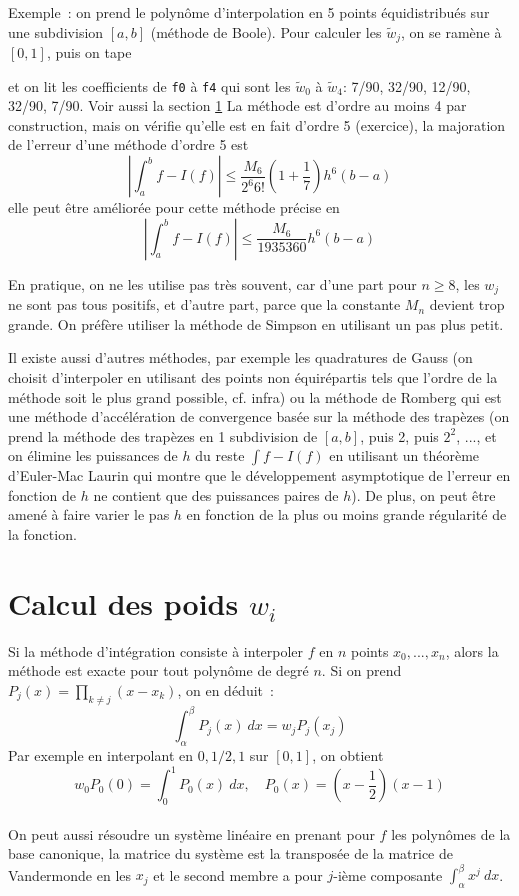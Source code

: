 \documentclass[a4paper,11pt]{book}
\begin{document}
\begin{giacjshere}
Exemple~: on prend le polyn\^ome d'interpolation en 5 points 
\'equidistribu\'es sur une subdivision $[a,b]$ (m\'ethode de Boole). 
Pour calculer les
$\tilde{w}_j$, on se ram\`ene \`a $[0,1]$, puis on tape
\begin{center}
\end{center}
et on lit les coefficients de \verb|f0| \`a \verb|f4|
qui sont les $\tilde{w}_0$ \`a  $\tilde{w}_4$: 7/90, 32/90, 12/90,
32/90, 7/90. Voir aussi la section \ref{sec:poids}
La m\'ethode est d'ordre au moins 4 par construction, mais on v\'erifie
qu'elle est en fait d'ordre 5 (exercice), la majoration de l'erreur
d'une m\'ethode d'ordre 5 est 
\[ |\int_a^b f -I(f)| \leq \frac{M_6}{2^6 6!}(1+\frac{1}{7}) h^6 (b-a) \]
elle peut \^etre am\'elior\'ee pour cette m\'ethode pr\'ecise en
\[ |\int_a^b f -I(f)| \leq \frac{M_6}{1935360} h^6 (b-a) \]

En pratique, on ne les utilise pas tr\`es souvent, car d'une part
pour $n\geq 8$, les $w_j$ ne sont pas tous positifs, et
d'autre part, parce que la constante $M_n$ devient trop
grande. On pr\'ef\`ere utiliser la m\'ethode de Simpson en utilisant
un pas plus petit.

Il existe aussi d'autres m\'ethodes, par exemple les quadratures de Gauss
(on choisit d'interpoler en utilisant des points non \'equir\'epartis 
tels que l'ordre de la m\'ethode soit le plus grand possible, cf. infra)
ou la m\'ethode de Romberg qui est une m\'ethode d'acc\'el\'eration
de convergence bas\'ee sur la m\'ethode des trap\`ezes (on prend
la m\'ethode des trap\`ezes en 1 subdivision de $[a,b]$, puis
2, puis $2^2$, ..., et on \'elimine les puissances de $h$
du reste $\int f-I(f)$ en utilisant un th\'eor\`eme d'Euler-Mac Laurin
qui montre que le d\'eveloppement asymptotique de
l'erreur en fonction de $h$ ne contient que des puissances paires
de $h$). De plus, on peut être amen\'e à faire varier le pas $h$
en fonction de la plus ou moins grande r\'egularit\'e de la fonction.


\section{Calcul des poids $w_i$} \label{sec:poids}
Si la m\'ethode d'int\'egration consiste \`a interpoler 
$f$ en $n$ points $x_0,...,x_n$, alors la m\'ethode est exacte pour
tout polyn\^ome de degr\'e $n$. Si on prend 
$P_j(x)=\prod_{k \neq j}(x-x_k)$, on en d\'eduit~:
$$ \int_\alpha^\beta P_j(x) \ dx = w_j P_j(x_j) $$ 
Par exemple en interpolant en $0,1/2,1$ sur $[0,1]$, on obtient
$$w_0 P_0(0)=\int_0^1 P_0(x) \ dx, \quad P_0(x)=(x-\frac{1}{2})(x-1)$$
\\
On peut aussi r\'esoudre un syst\`eme lin\'eaire en prenant pour $f$
les polyn\^omes de la base canonique, la matrice du syst\`eme est
la transpos\'ee de la matrice de Vandermonde en les $x_j$ et le second
membre a pour $j$-i\`eme composante $\int_\alpha^\beta x^j \ dx$.



\end{giacjshere}
\end{document}
